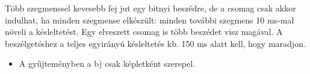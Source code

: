 \begin{center}\end{center}

Több szegmenssel kevesebb fej jut egy bitnyi beszédre, de a csomag csak akkor indulhat, ha minden szegmense elkészült: minden további szegmens 10 ms-mal növeli a késleltetést. Egy elveszett csomag is több beszédet visz magával. A beszélgetéshez a teljes egyirányú késleltetés kb. 150 ms alatt kell, hogy maradjon.
\begin{eredmeny}

\begin{center}\end{center}
\end{eredmeny}
\begin{tipp}[Ellenőrzés]
\begin{itemize}
\item A gyűjteményben a b) csak képletként szerepel.
\end{itemize}
\end{tipp}


